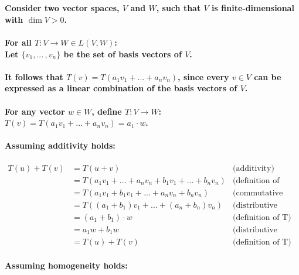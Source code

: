 \documentclass{article}
\begin{document}
\paragraph{\large
\\Consider two vector spaces, $V$ and $W$, such that $V$ is finite-dimensional with $\dim V > 0$.}

\paragraph{\large
For all $T: V \rightarrow W \in L(V, W)$:
\\Let $\{v_1,...\,,v_n\}$ be the set of basis vectors of $V$.}

\paragraph{\large
It follows that $T(v) = T(a_1v_1+...+a_nv_n)$, since every $v \in V$ can be expressed as a linear combination of the basis vectors of $V$.}

\paragraph{\large
For any vector $w \in W$, define $T: V \rightarrow W$:
\\$T(v) = T(a_1v_1+...+a_nv_n) = a_1 \cdot w$.}

\paragraph{\large
Assuming additivity holds:}

\begin{align*}
    T(u) + T(v) &= T(u + v) & \text{(additivity)}\\
    &= T(a_1v_1+...+a_nv_n+b_1v_1+...+b_nv_n) & \text{(definition of basis)}\\
    &= T(a_1v_1+b_1v_1+...+a_nv_n+b_nv_n) & \text{(commutative property)}\\
    &= T((a_1+b_1)v_1+...+(a_n+b_n)v_n) & \text{(distributive property)}\\
    &= (a_1+b_1) \cdot w & \text{(definition of T)}\\
    &= a_1w + b_1w & \text{(distributive property)}\\
    &= T(u) + T(v) & \text{(definition of T)}
\end{align*}

\paragraph{\large
Assuming homogeneity holds:}
\end{document}

